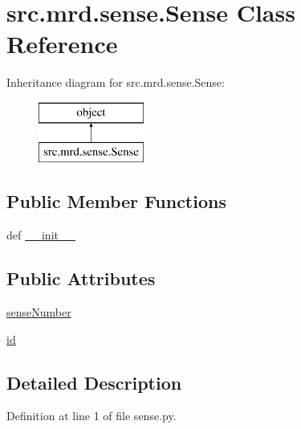 \hypertarget{classsrc_1_1mrd_1_1sense_1_1_sense}{\section{src.\+mrd.\+sense.\+Sense Class Reference}
\label{classsrc_1_1mrd_1_1sense_1_1_sense}
}
Inheritance diagram for src.\+mrd.\+sense.\+Sense\+:\begin{figure}[H]
\begin{center}
\leavevmode
\includegraphics[height=2.000000cm]{classsrc_1_1mrd_1_1sense_1_1_sense}
\end{center}
\end{figure}
\subsection*{Public Member Functions}
\begin{DoxyCompactItemize}
\item 
def \hyperlink{classsrc_1_1mrd_1_1sense_1_1_sense_ace40b018e791d57978a9fc16696f35c4}{\+\_\+\+\_\+init\+\_\+\+\_\+}
\end{DoxyCompactItemize}
\subsection*{Public Attributes}
\begin{DoxyCompactItemize}
\item 
\hyperlink{classsrc_1_1mrd_1_1sense_1_1_sense_a139f583f07d6128eff4d270a086ecee8}{sense\+Number}
\item 
\hyperlink{classsrc_1_1mrd_1_1sense_1_1_sense_af1ac7a255a1edfeb9d825123b0cf8bca}{id}
\end{DoxyCompactItemize}


\subsection{Detailed Description}


Definition at line 1 of file sense.\+py.



